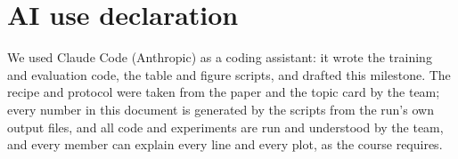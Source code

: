\documentclass[11pt,a4paper]{article}
\begin{document}
\section*{AI use declaration}
We used Claude Code (Anthropic) as a coding assistant: it wrote the training
and evaluation code, the table and figure scripts, and drafted this milestone.
The recipe and protocol were taken from the paper and the topic card by the
team; every number in this document is generated by the scripts from the run's
own output files, and all code and experiments are run and understood by the
team, and every member can explain every line and every plot, as the course
requires.
\end{document}
